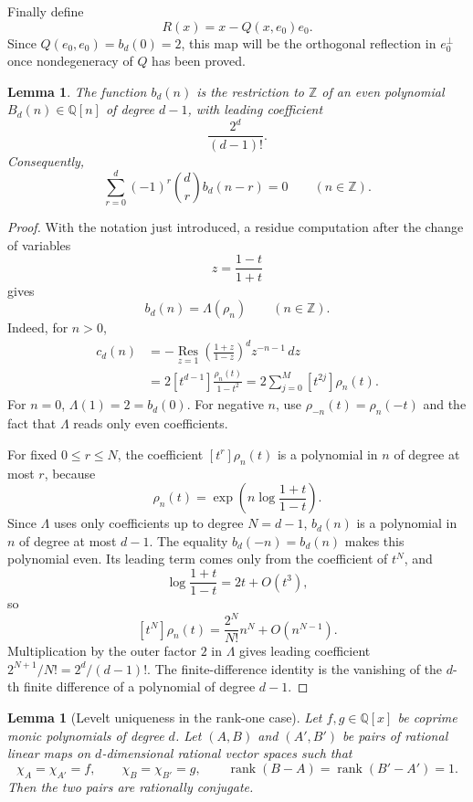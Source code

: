 \documentclass[a4paper,11pt]{amsart}
\newtheorem{lemma}[theorem]{Lemma}
\theoremstyle{remark}
\newcommand{\Z}{\mathbb Z}
\newcommand{\Q}{\mathbb Q}
\DeclareMathOperator{\rank}{rank}
\numberwithin{equation}{section}
\begin{document}
Finally define
\[
        R(x)=x-Q(x,e_0)e_0.
\]
Since \(Q(e_0,e_0)=b_d(0)=2\), this map will be the orthogonal reflection in \(e_0^\perp\) once nondegeneracy of \(Q\) has been proved.

\begin{lemma}\label{lem:b-polynomial}
The function \(b_d(n)\) is the restriction to \(\Z\) of an even polynomial \(B_d(n)\in\Q[n]\) of degree \(d-1\), with leading coefficient
\[
        \frac{2^d}{(d-1)!}.
\]
Consequently,
\[
        \sum_{r=0}^{d}(-1)^r\binom dr b_d(n-r)=0
        \qquad(n\in\Z).
\]
\end{lemma}

\begin{proof}
With the notation just introduced, a residue computation after the change of variables
\[
        z=\frac{1-t}{1+t}
\]
gives
\begin{equation}\label{eq:b-Lambda-rho}
        b_d(n)=\Lambda(\rho_n)
        \qquad(n\in\Z).
\end{equation}
Indeed, for \(n>0\),
\[
\begin{aligned}
        c_d(n)
        &=-\operatorname*{Res}_{z=1}
        \left(\frac{1+z}{1-z}\right)^d z^{-n-1}\,dz        \\
        &=2[t^{d-1}]\frac{\rho_n(t)}{1-t^2}
        =2\sum_{j=0}^{M}[t^{2j}]\rho_n(t).
\end{aligned}
\]
For \(n=0\), \(\Lambda(1)=2=b_d(0)\).  For negative \(n\), use \(\rho_{-n}(t)=\rho_n(-t)\) and the fact that \(\Lambda\) reads only even coefficients.

For fixed \(0\le r\le N\), the coefficient \([t^r]\rho_n(t)\) is a polynomial in \(n\) of degree at most \(r\), because
\[
        \rho_n(t)=\exp\left(n\log\frac{1+t}{1-t}\right).
\]
Since \(\Lambda\) uses only coefficients up to degree \(N=d-1\), \(b_d(n)\) is a polynomial in \(n\) of degree at most \(d-1\).  The equality \(b_d(-n)=b_d(n)\) makes this polynomial even.  Its leading term comes only from the coefficient of \(t^N\), and
\[
        \log\frac{1+t}{1-t}=2t+O(t^3),
\]
so
\[
        [t^N]\rho_n(t)=\frac{2^N}{N!}n^N+O(n^{N-1}).
\]
Multiplication by the outer factor \(2\) in \(\Lambda\) gives leading coefficient \(2^{N+1}/N!=2^d/(d-1)!\).  The finite-difference identity is the vanishing of the \(d\)-th finite difference of a polynomial of degree \(d-1\).
\end{proof}

\begin{lemma}[Levelt uniqueness in the rank-one case]\label{lem:levelt-uniqueness}
Let \(f,g\in\Q[x]\) be coprime monic polynomials of degree \(d\).  Let \((A,B)\) and \((A',B')\) be pairs of rational linear maps on \(d\)-dimensional rational vector spaces such that
\[
        \chi_A=\chi_{A'}=f,
        \qquad
        \chi_B=\chi_{B'}=g,
        \qquad
        \rank(B-A)=\rank(B'-A')=1.
\]
Then the two pairs are rationally conjugate.
\end{lemma}
\end{document}
